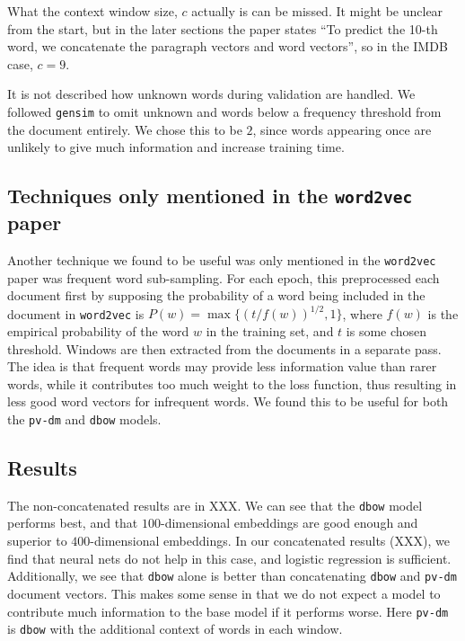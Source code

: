 \documentclass{article}
\begin{document}
What the context window size, $c$ actually is can be missed. It might be unclear from the start, but in the later sections the paper states ``To predict the 10-th word, we concatenate the paragraph vectors and word vectors'', so in the IMDB case, $c=9$.

It is not described how unknown words during validation are handled. We followed \texttt{gensim} to omit unknown and words below a frequency threshold from the document entirely. We chose this to be $2$, since words appearing once are unlikely to give much information and increase training time.

\subsection{Techniques only mentioned in the \texttt{word2vec} paper}
Another technique we found to be useful was only mentioned in the \texttt{word2vec} paper was frequent word sub-sampling. For each epoch, this preprocessed each document first by supposing the probability of a word being included in the document in \texttt{word2vec} is $P(w)=\max\{(t/f(w))^{1/2}, 1\}$, where $f(w)$ is the empirical probability of the word ${w}$ in the training set, and $t$ is some chosen threshold. Windows are then extracted from the documents in a separate pass. The idea is that frequent words may provide less information value than rarer words, while it contributes too much weight to the loss function, thus resulting in less good word vectors for infrequent words. We found this to be useful for both the \texttt{pv-dm} and \texttt{dbow} models.

\subsection{Results}
The non-concatenated results are in XXX. We can see that the \texttt{dbow} model performs best, and that $100$-dimensional embeddings are good enough and superior to $400$-dimensional embeddings. In our concatenated results (XXX), we find that neural nets do not help in this case, and logistic regression is sufficient. Additionally, we see that \texttt{dbow} alone is better than concatenating \texttt{dbow} and \texttt{pv-dm} document vectors. This makes some sense in that we do not expect a model to contribute much information to the base model if it performs worse. Here \texttt{pv-dm} is \texttt{dbow} with the additional context of words in each window.
\end{document}
